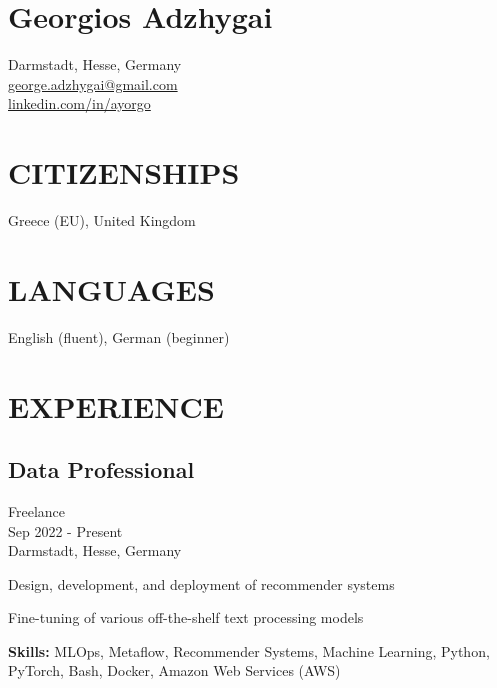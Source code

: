\documentclass[a4paper,10pt]{article}
\begin{document}
\section*{\Large Georgios Adzhygai}
Darmstadt, Hesse, Germany \\
\href{mailto:george.adzhygai@gmail.com}{george.adzhygai@gmail.com} \\
\href{https://www.linkedin.com/in/ayorgo}{linkedin.com/in/ayorgo}

\section*{CITIZENSHIPS}
Greece (EU), United Kingdom

\section*{LANGUAGES}
English (fluent), German (beginner)

\section*{EXPERIENCE}

\subsection*{Data Professional}
Freelance \\
Sep 2022 - Present \\
Darmstadt, Hesse, Germany
\begin{bulletlist}
    \item Design, development, and deployment of recommender systems
    \item Fine-tuning of various off-the-shelf text processing models
\end{bulletlist}
\textbf{Skills:} MLOps, Metaflow, Recommender Systems, Machine Learning, Python, PyTorch, Bash, Docker, Amazon
Web Services (AWS)
\end{document}
